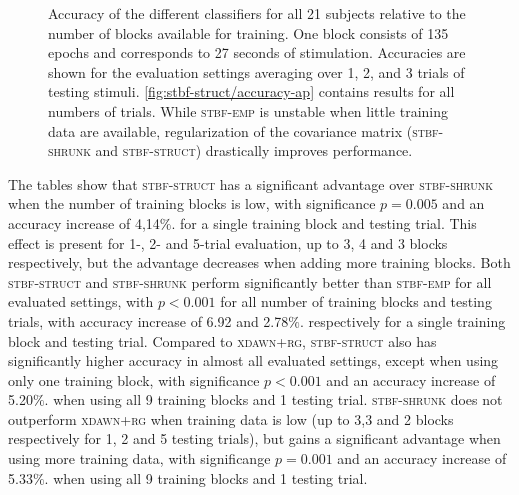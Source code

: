   \begin{figure}
    \sffamily
    \sansmath
    
    \caption[Clasifier accuracy in function of available training data.]{%
      Accuracy of the different classifiers for all 21 subjects relative to the
			number of blocks available for training. One block consists of 135
			epochs and corresponds to 27 seconds of stimulation. Accuracies
			are shown for the evaluation settings averaging over 1, 2, and
			3 trials of testing stimuli.
			\cref{fig:stbf-struct/accuracy-ap} contains results for all numbers of trials.
			While \textsc{stbf-emp} is unstable when little training data
			are available,
			regularization of the covariance matrix (\textsc{stbf-shrunk} and
			\textsc{stbf-struct}) drastically improves performance.}
		\label{fig:accuracy}
	\end{figure}

	The tables show that \textsc{stbf-struct} has a significant advantage over
  \textsc{stbf-shrunk} when the number of training blocks is low, with
  significance $p=0.005$ and  an accuracy increase of 4,14$\%.$ for a single training block
  and testing trial.
  This effect is present for 1-, 2- and 5-trial evaluation, up to 3, 4 and 3
  blocks respectively, but the advantage decreases when adding more training blocks.
	Both \textsc{stbf-struct} and \textsc{stbf-shrunk} perform significantly better
  than \textsc{stbf-emp} for all evaluated settings, with $p<0.001$ for all number
  of training blocks and testing trials, with accuracy
  increase of 6.92 and 2.78$\%.$ respectively for a single training block
  and testing trial.
	Compared to \textsc{xdawn+rg}, \textsc{stbf-struct} also has significantly
	higher accuracy in almost all evaluated settings, except when using only one
  training block, with significance $p<0.001$ and an accuracy increase of
  5.20$\%.$ when using all 9 training blocks and 1 testing trial.
	\textsc{stbf-shrunk} does not outperform \textsc{xdawn+rg} when training data
  is low (up to 3,3 and 2 blocks respectively for 1, 2 and 5 testing trials),
  but gains a significant advantage	when using more training data, with
  significange $p=0.001$ and an accuracy increase of 5.33$\%.$ when using all
  9 training blocks and 1 testing trial.

